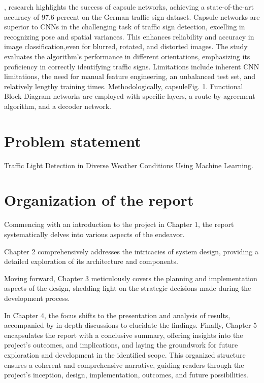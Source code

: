 \documentclass[12 pt]{report}
\begin{document}
{  \hspace*{1cm}{\bfseries  Amara Dinesh’s}, research highlights the success of capsule networks, achieving a state-of-the-art accuracy of 97.6 percent on the German traffic sign dataset. Capsule networks are superior to CNNs in the challenging task of traffic sign detection, excelling in recognizing pose and spatial variances. This enhances reliability and accuracy in image classification,even for blurred, rotated, and distorted images. The study evaluates the algorithm’s performance in different orientations, emphasizing its proficiency in correctly identifying traffic signs. Limitations include inherent CNN limitations, the need for manual feature engineering, an unbalanced test set, and relatively lengthy training times. Methodologically, capsuleFig. 1. Functional Block Diagram networks are employed with specific layers, a route-by-agreement algorithm, and a decoder network.
 }

\section{Problem statement}
Traffic Light Detection in Diverse Weather Conditions Using Machine Learning.
\section{Organization of the report}
Commencing with an introduction to the project in Chapter 1, the report systematically delves into various aspects of the endeavor.

Chapter 2 comprehensively addresses the intricacies of system design, providing a detailed exploration of its architecture and components.

Moving forward, Chapter 3 meticulously covers the planning and implementation aspects of the design, shedding light on the strategic decisions made during the development process.

In Chapter 4, the focus shifts to the presentation and analysis of results, accompanied by in-depth discussions to elucidate the findings. Finally, Chapter 5 encapsulates the report with a conclusive summary, offering insights into the project's outcomes, and implications, and laying the groundwork for future exploration and development in the identified scope. This organized structure ensures a coherent and comprehensive narrative, guiding readers through the project's inception, design, implementation, outcomes, and future possibilities.

\newpage
\end{document}
